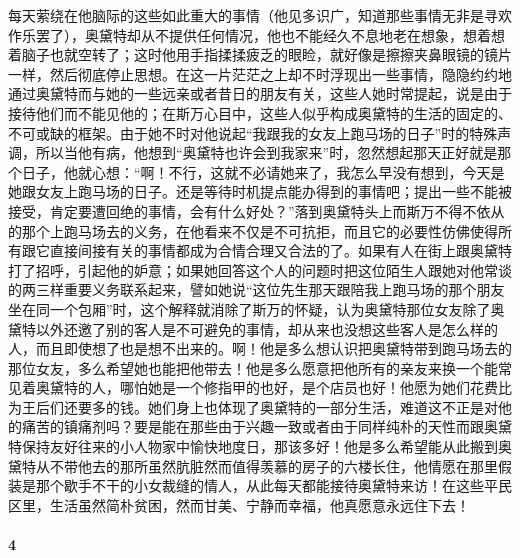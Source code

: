 \par 每天萦绕在他脑际的这些如此重大的事情（他见多识广，知道那些事情无非是寻欢作乐罢了），奥黛特却从不提供任何情况，他也不能经久不息地老在想象，想着想着脑子也就空转了；这时他用手指揉揉疲乏的眼睑，就好像是擦擦夹鼻眼镜的镜片一样，然后彻底停止思想。在这一片茫茫之上却不时浮现出一些事情，隐隐约约地通过奥黛特而与她的一些远亲或者昔日的朋友有关，这些人她时常提起，说是由于接待他们而不能见他的；在斯万心目中，这些人似乎构成奥黛特的生活的固定的、不可或缺的框架。由于她不时对他说起“我跟我的女友上跑马场的日子”时的特殊声调，所以当他有病，他想到“奥黛特也许会到我家来”时，忽然想起那天正好就是那个日子，他就心想：“啊！不行，这就不必请她来了，我怎么早没有想到，今天是她跟女友上跑马场的日子。还是等待时机提点能办得到的事情吧；提出一些不能被接受，肯定要遭回绝的事情，会有什么好处？”落到奥黛特头上而斯万不得不依从的那个上跑马场去的义务，在他看来不仅是不可抗拒，而且它的必要性仿佛使得所有跟它直接间接有关的事情都成为合情合理又合法的了。如果有人在街上跟奥黛特打了招呼，引起他的妒意；如果她回答这个人的问题时把这位陌生人跟她对他常谈的两三样重要义务联系起来，譬如她说“这位先生那天跟陪我上跑马场的那个朋友坐在同一个包厢”时，这个解释就消除了斯万的怀疑，认为奥黛特那位女友除了奥黛特以外还邀了别的客人是不可避免的事情，却从来也没想这些客人是怎么样的人，而且即使想了也是想不出来的。啊！他是多么想认识把奥黛特带到跑马场去的那位女友，多么希望她也能把他带去！他是多么愿意把他所有的亲友来换一个能常见着奥黛特的人，哪怕她是一个修指甲的也好，是个店员也好！他愿为她们花费比为王后们还要多的钱。她们身上也体现了奥黛特的一部分生活，难道这不正是对他的痛苦的镇痛剂吗？要是能在那些由于兴趣一致或者由于同样纯朴的天性而跟奥黛特保持友好往来的小人物家中愉快地度日，那该多好！他是多么希望能从此搬到奥黛特从不带他去的那所虽然肮脏然而值得羡慕的房子的六楼长住，他情愿在那里假装是那个歇手不干的小女裁缝的情人，从此每天都能接待奥黛特来访！在这些平民区里，生活虽然简朴贫困，然而甘美、宁静而幸福，他真愿意永远住下去！


\paragraph*{4}

